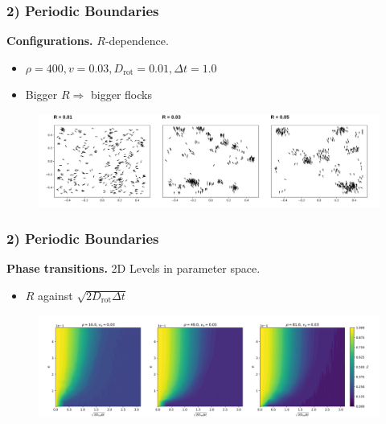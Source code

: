 \begin{frame}
	\frametitle{2) Periodic Boundaries}
	\textbf{Configurations.} $R$-dependence.
	\begin{itemize}
	    \item $\rho = 400, v = 0.03, D_{\text{rot}} = 0.01, \Delta t = 1.0$
	    \item Bigger $R\Rightarrow$ bigger flocks 
	\end{itemize}
	\begin{figure}[H]
  		\includegraphics[width=\textwidth]{images/chapter2/N_20_L_1.000000_v_0.030000_R_D_0.010000.png} 
	\end{figure}
\end{frame}

\begin{frame}
	\frametitle{2) Periodic Boundaries}
	\textbf{Phase transitions.} 2D Levels in parameter space.
	\begin{itemize}
	    \item $R$ against $\sqrt{2D_{\text{rot}}\Delta t}$
	\end{itemize}
	\begin{figure}[H]
  		\includegraphics[width=\textwidth]{images/chapter2/r_eta_transition_2D_plots_rho_comparison.png} 
	\end{figure}
\end{frame}

